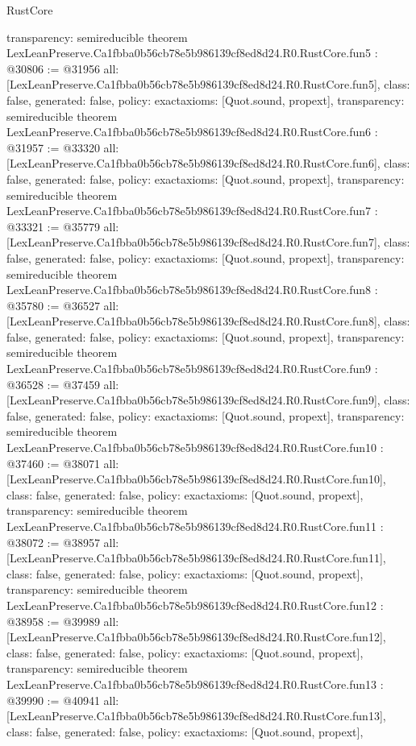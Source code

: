 \begin{lexlean}{RustCore}
\begin{coremodule}
{  transparency: semireducible
}
theorem LexLeanPreserve.Ca1fbba0b56cb78e5b986139cf8ed8d24.R0.RustCore.fun5 : @30806 := @31956 {
  all: [LexLeanPreserve.Ca1fbba0b56cb78e5b986139cf8ed8d24.R0.RustCore.fun5],
  class: false,
  generated: false,
  policy: exact{axioms: [Quot.sound, propext]},
  transparency: semireducible
}
theorem LexLeanPreserve.Ca1fbba0b56cb78e5b986139cf8ed8d24.R0.RustCore.fun6 : @31957 := @33320 {
  all: [LexLeanPreserve.Ca1fbba0b56cb78e5b986139cf8ed8d24.R0.RustCore.fun6],
  class: false,
  generated: false,
  policy: exact{axioms: [Quot.sound, propext]},
  transparency: semireducible
}
theorem LexLeanPreserve.Ca1fbba0b56cb78e5b986139cf8ed8d24.R0.RustCore.fun7 : @33321 := @35779 {
  all: [LexLeanPreserve.Ca1fbba0b56cb78e5b986139cf8ed8d24.R0.RustCore.fun7],
  class: false,
  generated: false,
  policy: exact{axioms: [Quot.sound, propext]},
  transparency: semireducible
}
theorem LexLeanPreserve.Ca1fbba0b56cb78e5b986139cf8ed8d24.R0.RustCore.fun8 : @35780 := @36527 {
  all: [LexLeanPreserve.Ca1fbba0b56cb78e5b986139cf8ed8d24.R0.RustCore.fun8],
  class: false,
  generated: false,
  policy: exact{axioms: [Quot.sound, propext]},
  transparency: semireducible
}
theorem LexLeanPreserve.Ca1fbba0b56cb78e5b986139cf8ed8d24.R0.RustCore.fun9 : @36528 := @37459 {
  all: [LexLeanPreserve.Ca1fbba0b56cb78e5b986139cf8ed8d24.R0.RustCore.fun9],
  class: false,
  generated: false,
  policy: exact{axioms: [Quot.sound, propext]},
  transparency: semireducible
}
theorem LexLeanPreserve.Ca1fbba0b56cb78e5b986139cf8ed8d24.R0.RustCore.fun10 : @37460 := @38071 {
  all: [LexLeanPreserve.Ca1fbba0b56cb78e5b986139cf8ed8d24.R0.RustCore.fun10],
  class: false,
  generated: false,
  policy: exact{axioms: [Quot.sound, propext]},
  transparency: semireducible
}
theorem LexLeanPreserve.Ca1fbba0b56cb78e5b986139cf8ed8d24.R0.RustCore.fun11 : @38072 := @38957 {
  all: [LexLeanPreserve.Ca1fbba0b56cb78e5b986139cf8ed8d24.R0.RustCore.fun11],
  class: false,
  generated: false,
  policy: exact{axioms: [Quot.sound, propext]},
  transparency: semireducible
}
theorem LexLeanPreserve.Ca1fbba0b56cb78e5b986139cf8ed8d24.R0.RustCore.fun12 : @38958 := @39989 {
  all: [LexLeanPreserve.Ca1fbba0b56cb78e5b986139cf8ed8d24.R0.RustCore.fun12],
  class: false,
  generated: false,
  policy: exact{axioms: [Quot.sound, propext]},
  transparency: semireducible
}
theorem LexLeanPreserve.Ca1fbba0b56cb78e5b986139cf8ed8d24.R0.RustCore.fun13 : @39990 := @40941 {
  all: [LexLeanPreserve.Ca1fbba0b56cb78e5b986139cf8ed8d24.R0.RustCore.fun13],
  class: false,
  generated: false,
  policy: exact{axioms: [Quot.sound, propext]},
}
\end{coremodule}
\end{lexlean}
